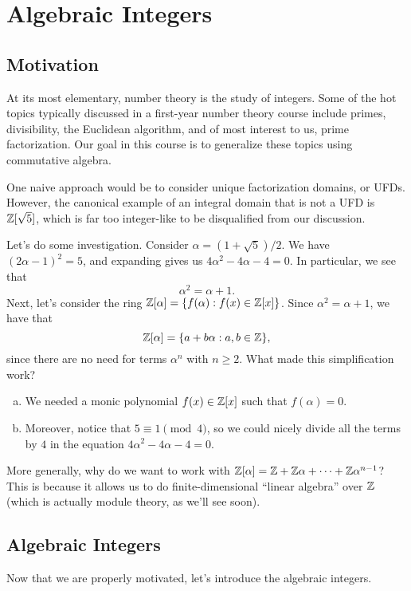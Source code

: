 \section{Algebraic Integers}\label{sec:1}

\subsection{Motivation}\label{subsec:1.1}
At its most elementary, number theory is the study of integers. Some of the 
hot topics typically discussed in a first-year number theory course 
include primes, divisibility, the Euclidean algorithm, and of most 
interest to us, prime factorization. Our goal in this course is to generalize 
these topics using commutative algebra. 

One naive approach would be to consider unique factorization domains, or 
UFDs. However, the canonical example of an integral domain
that is not a UFD is $\mathbb{Z}[\sqrt{5}]$, which is far too integer-like 
to be disqualified from our discussion. 

Let's do some investigation. Consider $\alpha = (1 + \sqrt{5})/2$. We have 
$(2\alpha - 1)^2 = 5$, and expanding gives us $4\alpha^2 - 4\alpha - 4 = 0$. 
In particular, we see that 
\[ \alpha^2 = \alpha + 1. \] 
Next, let's consider the ring $\mathbb{Z}[\alpha] = \{f(\alpha) : f(x) \in \mathbb{Z}[x]\}$. 
Since $\alpha^2 = \alpha + 1$, we have that
\[ \mathbb{Z}[\alpha] = \{a + b\alpha : a, b \in \mathbb{Z}\}, \] 
since there are no need for terms $\alpha^n$ with $n \geq 2$. What made 
this simplification work? 
\begin{enumerate}[(a)]
    \item We needed a monic polynomial $f(x) \in \mathbb{Z}[x]$ such that $f(\alpha) = 0$. 
    \item Moreover, notice that $5 \equiv 1 \pmod 4$, so we could nicely 
    divide all the terms by $4$ in the equation $4\alpha^2 - 4\alpha - 4 = 0$. 
\end{enumerate}
More generally, why do we want to work with $\mathbb{Z}[\alpha] = \mathbb{Z} + \mathbb{Z}\alpha 
+ \cdots + \mathbb{Z}\alpha^{n-1}$? This is because it allows us to do 
finite-dimensional ``linear algebra'' over $\mathbb{Z}$ (which is actually module 
theory, as we'll see soon).

\subsection{Algebraic Integers}\label{subsec:1.2}
Now that we are properly motivated, let's introduce the algebraic integers.

